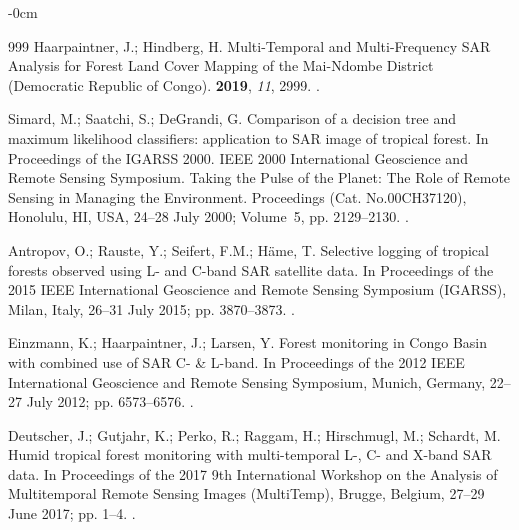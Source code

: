\documentclass[applsci,article,accept,pdftex,moreauthors]{Definitions/mdpi}
\begin{document}
\begin{adjustwidth}{-\extralength}{0cm}
\begin{thebibliography}{999}
Haarpaintner, J.; Hindberg, H.
\newblock Multi-Temporal and Multi-Frequency SAR Analysis for Forest Land Cover
  Mapping of the Mai-Ndombe District (Democratic Republic of Congo).
 {\bf 2019}, {\em 11}, 2999.
.

Simard, M.; Saatchi, S.; DeGrandi, G.
\newblock Comparison of a decision tree and maximum likelihood classifiers:
  application to SAR image of tropical forest.
\newblock In Proceedings of the IGARSS 2000. IEEE 2000 International Geoscience
  and Remote Sensing Symposium. Taking the Pulse of the Planet: The Role of
  Remote Sensing in Managing the Environment. Proceedings (Cat. No.00CH37120), Honolulu, HI, USA, 24--28 July 2000; %
 Volume~5, pp. 2129--2130.
.

Antropov, O.; Rauste, Y.; Seifert, F.M.; Häme, T.
\newblock Selective logging of tropical forests observed using L- and C-band
  SAR satellite data.
\newblock In Proceedings of the 2015 IEEE International Geoscience and Remote
  Sensing Symposium (IGARSS), Milan, Italy, 26--31 July 2015; %
   pp. 3870--3873.
.

Einzmann, K.; Haarpaintner, J.; Larsen, Y.
\newblock Forest monitoring in Congo Basin with combined use of SAR C- \&
  L-band.
\newblock In Proceedings of the 2012 IEEE International Geoscience and Remote
  Sensing Symposium, Munich, Germany, 22--27 July  2012; %
 pp. 6573--6576.
.

Deutscher, J.; Gutjahr, K.; Perko, R.; Raggam, H.; Hirschmugl, M.; Schardt, M.
\newblock Humid tropical forest monitoring with multi-temporal L-, C- and
  X-band SAR data.
\newblock In Proceedings of the 2017 9th International Workshop on the Analysis
  of Multitemporal Remote Sensing Images (MultiTemp), Brugge, Belgium, 27--29 June 2017; %
 pp. 1--4.
.


\end{thebibliography}
\end{adjustwidth}
\end{document}

